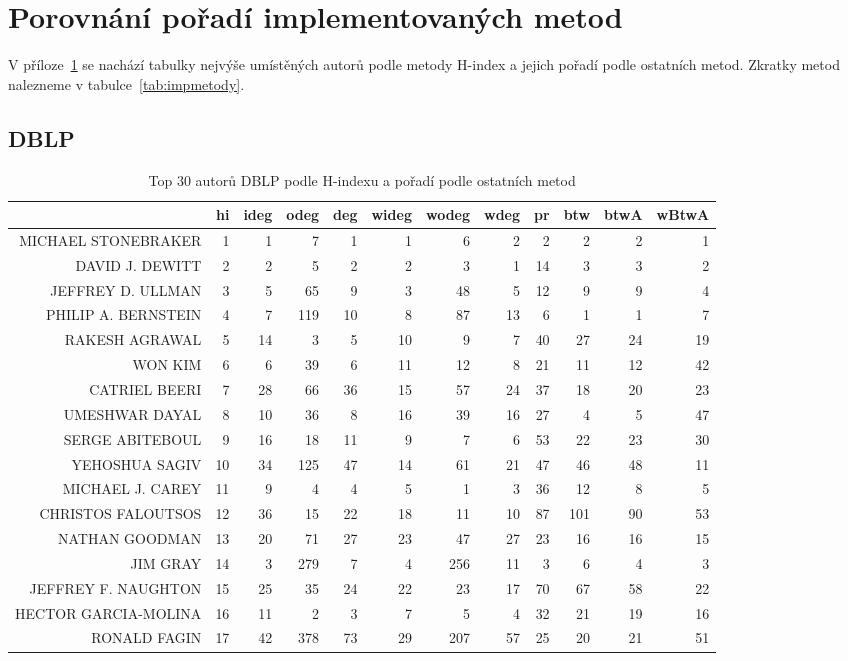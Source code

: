 \documentclass{bakalarka}
\begin{document}
\newpage
\chapter{Porovnání pořadí implementovaných metod}
\label{chapter:porovnani}
V příloze~\ref{chapter:porovnani} se nachází tabulky nejvýše umístěných autorů
podle metody H-index a jejich pořadí podle ostatních metod. Zkratky metod
nalezneme v tabulce~\ref{tab:impmetody}.
\section{DBLP}

\begin{table}[!ht]
\centering
\caption{Top 30 autorů DBLP podle H-indexu a pořadí podle ostatních metod}
\label{tab:ranks1}
\begin{sideways}
\begin{scriptsize}
\begin{tabular}{r|r|rrrrrrrrrr}
\toprule
&hi&ideg&odeg&deg&wideg&wodeg&wdeg&pr&btw&btwA&wBtwA\\
\midrule
MICHAEL STONEBRAKER&1&1&7&1&1&6&2&2&2&2&1\\
DAVID J. DEWITT&2&2&5&2&2&3&1&14&3&3&2\\
JEFFREY D. ULLMAN&3&5&65&9&3&48&5&12&9&9&4\\
PHILIP A. BERNSTEIN&4&7&119&10&8&87&13&6&1&1&7\\
RAKESH AGRAWAL&5&14&3&5&10&9&7&40&27&24&19\\
WON KIM&6&6&39&6&11&12&8&21&11&12&42\\
CATRIEL BEERI&7&28&66&36&15&57&24&37&18&20&23\\
UMESHWAR DAYAL&8&10&36&8&16&39&16&27&4&5&47\\
SERGE ABITEBOUL&9&16&18&11&9&7&6&53&22&23&30\\
YEHOSHUA SAGIV&10&34&125&47&14&61&21&47&46&48&11\\
MICHAEL J. CAREY&11&9&4&4&5&1&3&36&12&8&5\\
CHRISTOS FALOUTSOS&12&36&15&22&18&11&10&87&101&90&53\\
NATHAN GOODMAN&13&20&71&27&23&47&27&23&16&16&15\\
JIM GRAY&14&3&279&7&4&256&11&3&6&4&3\\
JEFFREY F. NAUGHTON&15&25&35&24&22&23&17&70&67&58&22\\
HECTOR GARCIA-MOLINA&16&11&2&3&7&5&4&32&21&19&16\\
RONALD FAGIN&17&42&378&73&29&207&57&25&20&21&51\\

\end{tabular}
\end{scriptsize}
\end{sideways}
\end{table}
\end{document}
